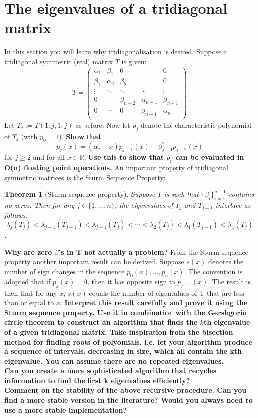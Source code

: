 \documentclass[12pt]{article}
\newtheorem{theorem}{Theorem}
\begin{document}
\section{The eigenvalues of a tridiagonal matrix}
In this section you will learn why tridiagonalisation is desired. Suppose a tridiagonal symmetric (real) matrix $T$ is given:
$$T=\begin{pmatrix}
\alpha_1&\beta_1&0&\cdots&0\\
\beta_1&\alpha_2&\beta_2&&0\\
\vdots&\ddots&\ddots&\ddots&\vdots\\
0&&\beta_{n-2}&\alpha_{n-1}&\beta_{n-1}\\
0&\cdots&0&\beta_{n-1}&\alpha_{n}\\
\end{pmatrix}$$
Let $T_j := T (1 : j, 1 : j)$ as before. Now let $p_j$ denote the characteristic polynomial of $T_j$ (with $p_0 = 1$). \textbf{Show that}
$$p_j(x) = (\alpha_j - x)p_{j-1} (x) - \beta_{j-1}^2
p_{j-2}(x)$$
for $j\geq 2$ and for all $x \in \mathbb{R}$. \textbf{Use this to show that $p_n$ can be evaluated in O(n) floating point operations.}
An important property of tridiagonal symmetric matrices is the Sturm Sequence Property:

\begin{theorem}[Sturm sequence property]
Suppose $T$ is such that $\{\beta_i\}_{i=1}^{n-1}$ contains no zeros. Then for any $j \in \{1,\ldots,n\}$, the eigenvalues of $T_j$ and $T_{j-1}$ interlace as follows:
$$\lambda_j(T_j) <\lambda_{j-1}(T_{j-1}) < \lambda_{j-1}(T_j) <\cdots< \lambda_2(T_j) <\lambda_1(T_{j-1}) < \lambda_1(T_j)$$.
\end{theorem} 
\textbf{Why are zero $\beta$’s in T not actually a problem?}
From the Sturm sequence property another important result can be derived. Suppose $s(x)$ denotes
the number of sign changes in the sequence ${p_0(x),\ldots, p_n(x)}$. The convention is adopted that if
$p_j (x) = 0$, then it has opposite sign to $p_{j-1}(x)$. The result is then that for any $x$, $s(x)$ equals the
number of eigenvalues of T that are less than or equal to $x$.
\textbf{Interpret this result carefully and prove it using the Sturm sequence property. Use
it in combination with the Gershgorin circle theorem to construct an
algorithm that finds the $k$th eigenvalue of a given tridiagonal matrix. Take inspiration
from the bisection method for finding roots of polyomials, i.e. let your algorithm produce
a sequence of intervals, decreasing in size, which all contain the kth eigenvalue. You can assume there are no repeated eigenvalues.}\\
\textbf{Can you create a more sophisticated algorithm that recycles information to find
the first k eigenvalues efficiently?\\}
\textbf{Comment on the stability of the above recursive procedure. Can you find a more stable version in the literature? Would you always need to use a more stable implementation?}
\end{document}
